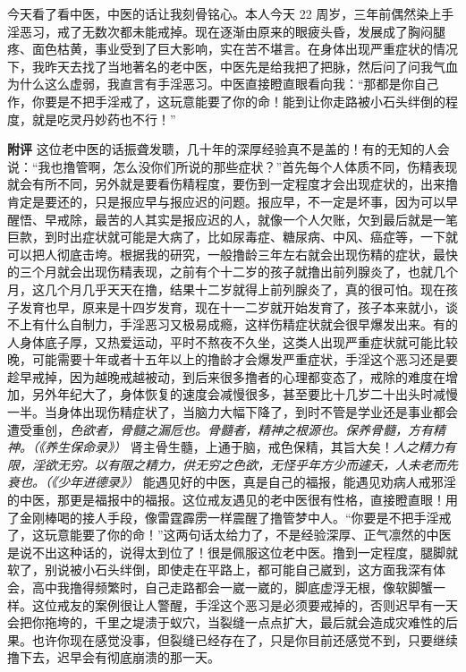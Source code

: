 \begin{case}
    今天看了看中医，中医的话让我刻骨铭心。本人今天 22 周岁，三年前偶然染上手淫恶习，戒了无数次都未能戒掉。现在逐渐由原来的眼疲头昏，发展成了胸闷腿疼、面色枯黄，事业受到了巨大影响，实在苦不堪言。在身体出现严重症状的情况下，我昨天去找了当地著名的老中医，中医先是给我把了把脉，然后问了问我气血为什么这么虚弱，我直言有手淫恶习。中医直接瞪直眼看向我：“那都是你自己作，你要是不把手淫戒了，这玩意能要了你的命！能到让你走路被小石头绊倒的程度，就是吃灵丹妙药也不行！”

    \textbf{附评} 这位老中医的话振聋发聩，几十年的深厚经验真不是盖的！有的无知的人会说：“我也撸管啊，怎么没你们所说的那些症状？”首先每个人体质不同，伤精表现就会有所不同，另外就是要看伤精程度，要伤到一定程度才会出现症状的，出来撸肯定是要还的，只是报应早与报应迟的问题。报应早，不一定是坏事，因为可以早醒悟、早戒除，最苦的人其实是报应迟的人，就像一个人欠账，欠到最后就是一笔巨款，到时出症状就可能是大病了，比如尿毒症、糖尿病、中风、癌症等，一下就可以把人彻底击垮。根据我的研究，一般撸龄三年左右就会出现伤精的症状，最快的三个月就会出现伤精表现，之前有个十二岁的孩子就撸出前列腺炎了，也就几个月，这几个月几乎天天在撸，结果十二岁就得上前列腺炎了，真的很可怕。现在孩子发育也早，原来是十四岁发育，现在十一二岁就开始发育了，孩子本来就小，谈不上有什么自制力，手淫恶习又极易成瘾，这样伤精症状就会很早爆发出来。有的人身体底子厚，又热爱运动，平时不熬夜不久坐，这类人出现严重症状就可能比较晚，可能需要十年或者十五年以上的撸龄才会爆发严重症状，手淫这个恶习还是要趁早戒掉，因为越晚戒越被动，到后来很多撸者的心理都变态了，戒除的难度在增加，另外年纪大了，身体恢复的速度会减慢很多，甚至要比十几岁二十出头时减慢一半。当身体出现伤精症状了，当脑力大幅下降了，到时不管是学业还是事业都会遭受重创，\textit{色欲者，骨髓之漏卮也。骨髓者，精神之根源也。保养骨髓，方有精神。（《养生保命录》）} 肾主骨生髓，上通于脑，戒色保精，其旨大矣！\textit{人之精力有限，淫欲无穷。以有限之精力，供无穷之色欲，无怪乎年方少而遽夭，人未老而先衰也。（《少年进德录》）} 能遇见好的中医，真是自己的福报，能遇见劝病人戒邪淫的中医，那更是福报中的福报。这位戒友遇见的老中医很有性格，直接瞪直眼！用了金刚棒喝的接人手段，像雷霆霹雳一样震醒了撸管梦中人。“你要是不把手淫戒了，这玩意能要了你的命！”这两句话太给力了，不是经验深厚、正气凛然的中医是说不出这种话的，说得太到位了！很是佩服这位老中医。撸到一定程度，腿脚就软了，别说被小石头绊倒，即使走在平路上，都可能自己崴到，这方面我深有体会，高中我撸得频繁时，自己走路都会一崴一崴的，脚底虚浮无根，像软脚蟹一样。这位戒友的案例很让人警醒，手淫这个恶习是必须要戒掉的，否则迟早有一天会把你拖垮的，千里之堤溃于蚁穴，当裂缝一点点扩大，最后就会造成灾难性的后果。也许你现在感觉没事，但裂缝已经存在了，只是你目前还感觉不到，只要继续撸下去，迟早会有彻底崩溃的那一天。
\end{case}

